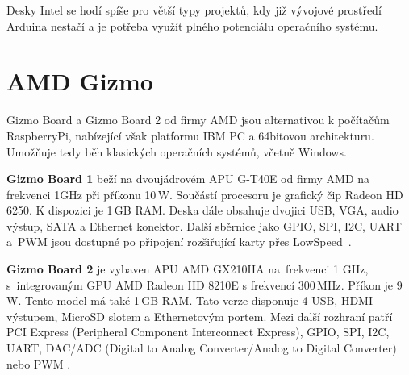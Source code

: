 Desky Intel se hodí spíše pro větší typy projektů, kdy již vývojové prostředí Arduina nestačí a je potřeba využít plného potenciálu operačního systému.


 \section{AMD Gizmo}
\label{KapAMD}

	Gizmo Board a Gizmo Board 2 od firmy AMD jsou alternativou k počítačům RaspberryPi, nabízející však platformu IBM PC a 64bitovou architekturu. Umožňuje tedy běh klasických operačních systémů, včetně Windows.
	
		\textbf{Gizmo Board 1} beží na dvoujádrovém APU G-T40E od firmy AMD na frekvenci 1GHz při příkonu 10\,W. Součástí procesoru je grafický čip Radeon HD 6250. K dispozici je 1\,GB RAM. Deska dále obsahuje dvojici USB, VGA, audio výstup, SATA a Ethernet konektor. Další sběrnice jako GPIO, SPI, I2C, UART a~PWM jsou dostupné po připojení rozšiřující karty přes LowSpeed~\cite{AmdGizmo1}.
	
	\textbf{ Gizmo Board 2} je vybaven APU AMD GX210HA na~frekvenci 1 GHz, s~integrovaným GPU AMD Radeon HD 8210E s frekvencí 300\,MHz. Příkon je 9\,W. Tento model má také 1\,GB RAM. Tato verze disponuje 4 USB, HDMI výstupem, MicroSD slotem a Ethernetovým portem. Mezi další rozhraní patří PCI Express (Peripheral Component Interconnect Express), GPIO, SPI, I2C, UART, DAC/ADC (Digital to Analog Converter/Analog to Digital Converter) nebo PWM \cite{AmdGizmo2}.


